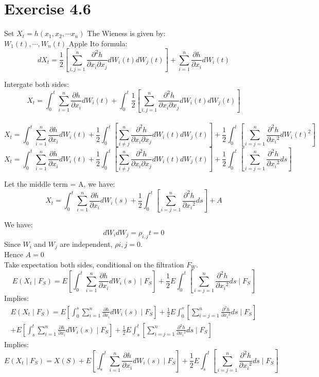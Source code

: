 \documentclass[12pt]{article}
\begin{document}
\section{Exercise 4.6}
Set $X_t = h(x_1,x_2, \cdots x_n)$
The Wieness is given by:\\
$W_1(t), \cdots , W_n(t)$
Apple Ito formula:\\
$$dX_t = \frac{1}{2}\left[\sum_{i,j =1}^n\frac{\partial^2h}{\partial x_i \partial x_j}dW_i(t)dW_j(t)  \right] + \sum_{i=1}^n \frac{\partial h}{\partial x_i}dW_i(t)$$

Intergate both sides:\\

$$X_t = \int_0^t \sum_{i=1}^n \frac{\partial h}{\partial x_i}dW_i(t) + \int_0^t \frac{1}{2}\left[\sum_{i,j =1}^n\frac{\partial^2h}{\partial x_i \partial x_j}dW_i(t)dW_j(t)  \right]$$\\
$$X_t =  \int_0^t \sum_{i=1}^n \frac{\partial h}{\partial x_i}dW_i(t) +\frac{1}{2} \int_0^t \left[\sum_{i \neq j}^n\frac{\partial^2h}{\partial x_i \partial x_j}dW_i(t)dW_j(t)  \right] + \frac{1}{2} \int_0^t \left[\sum_{i=j=1}^n\frac{\partial^2h}{\partial {x_i}^2}{dW_i(t)}^2 \right]$$ 
$$X_t =  \int_0^t \sum_{i=1}^n \frac{\partial h}{\partial x_i}dW_i(t) +\frac{1}{2} \int_0^t \left[\sum_{i \neq j}^n\frac{\partial^2h}{\partial x_i \partial x_j}dW_i(t)dW_j(t)  \right] + \frac{1}{2} \int_0^t \left[\sum_{i=j=1}^n\frac{\partial^2h}{\partial {x_i}^2}ds \right]$$ 

Let the middle term = A, we have:\\
$$X_t =  \int_0^t \sum_{i=1}^n \frac{\partial h}{\partial x_i}dW_i(s) + \frac{1}{2} \int_0^t \left[\sum_{i=j=1}^n\frac{\partial^2h}{\partial {x_i}^2}ds \right] + A$$ 

We have:\\
$$dW_i dW_j = \rho_{i,j}t = 0$$
Since $W_i$ and $W_j$ are independent, $\rho{i,j} = 0$.\\
Hence $A=0$\\


Take expectation both sides, conditional on the filtration $F_W$.\\

$$E(X_t \mid F_S) =  E\left[ \int_0^t \sum_{i=1}^n \frac{\partial h}{\partial x_i}dW_i(s)\mid F_S \right] + \frac{1}{2} E\int_0^t \left[\sum_{i=j=1}^n\frac{\partial^2h}{\partial {x_i}^2}ds \mid F_S \right] $$
Implies:\\
\begin{multline*}
E(X_t \mid F_S) =  E\left[ \int_0^s \sum_{i=1}^n \frac{\partial h}{\partial x_i}dW_i(s)\mid F_S \right] + \frac{1}{2} E\int_0^s\left[\sum_{i=j=1}^n\frac{\partial^2h}{\partial {x_i}^2}ds \mid F_S \right]  \\
+E\left[ \int_s^t \sum_{i=1}^n \frac{\partial h}{\partial x_i}dW_i(s)\mid F_S \right] + \frac{1}{2} E\int_s^t \left[\sum_{i=j=1}^n\frac{\partial^2h}{\partial {x_i}^2}ds \mid F_S \right] 
\end{multline*}
Implies:\\
$$E(X_t \mid F_S) = X(S) + E\left[ \int_s^t \sum_{i=1}^n \frac{\partial h}{\partial x_i}dW_i(s)\mid F_S \right] + \frac{1}{2} E\int_s^t \left[\sum_{i=j=1}^n\frac{\partial^2h}{\partial {x_i}^2}ds \mid F_S \right] $$
\end{document}

